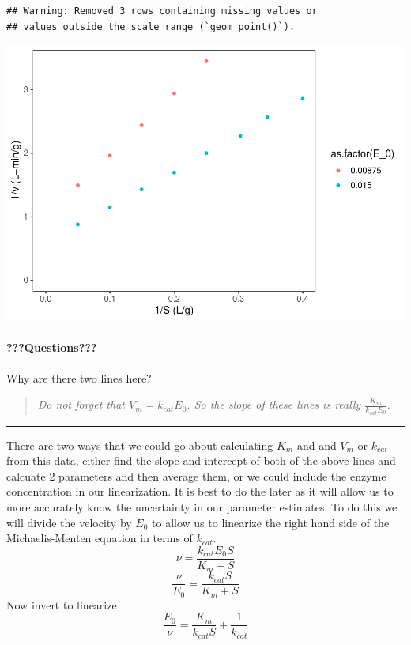 \documentclass[
]{article}
\begin{document}
\begin{verbatim}
## Warning: Removed 3 rows containing missing values or
## values outside the scale range (`geom_point()`).
\end{verbatim}

\includegraphics{Bioprocess_Engineering_files/figure-latex/unnamed-chunk-31-1.pdf}

\hypertarget{questions-11}{%
\paragraph{???Questions???}\label{questions-11}}

Why are there two lines here?

\begin{quote}
\emph{Do not forget that \(V_m = k_{cat}E_0\). So the slope of these lines is really \(\frac{K_m}{k_{cat}E_0}\).}
\end{quote}

\begin{center}\rule{0.5\linewidth}{0.5pt}\end{center}

There are two ways that we could go about calculating \(K_m\) and and \(V_m\) or \(k_{cat}\) from this data, either find the slope and intercept of both of the above lines and calcuate 2 parameters and then average them, or we could include the enzyme concentration in our linearization. It is best to do the later as it will allow us to more accurately know the uncertainty in our parameter estimates. To do this we will divide the velocity by \(E_0\) to allow us to linearize the right hand side of the Michaelis-Menten equation in terms of \(k_{cat}\).
\[\nu = \frac{k_{cat}E_0S}{K_m + S}\]
\[\frac{\nu}{E_0} = \frac{k_{cat}S}{K_m + S}\]
Now invert to linearize
\[\frac{E_0}{\nu} = \frac{K_m}{k_{cat}S} + \frac{1}{k_{cat}}\]
\end{document}
